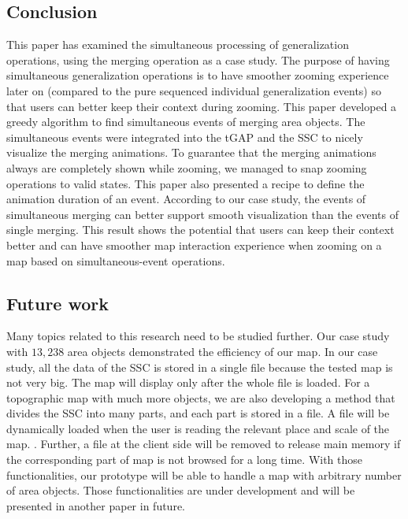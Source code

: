\documentclass[twocolumn]{svjour3}          %
\begin{document}
\subsection{Conclusion}
This paper has examined the simultaneous processing 
of generalization operations,
using the merging operation as a case study. 
The purpose of having simultaneous generalization operations 
is to have smoother zooming experience later on 
(compared to the pure sequenced individual generalization events)
so that users can better keep their context during zooming.
This paper developed a greedy algorithm to find simultaneous events of 
merging area objects.
The simultaneous events were integrated into 
the tGAP and the SSC to nicely visualize the merging animations.
To guarantee that the merging animations always are completely shown while zooming, 
we managed to snap zooming operations to valid states.
This paper also presented a recipe 
to define the animation duration of an event.
According to our case study,
the events of simultaneous merging 
can better support smooth visualization than the events of single merging.
This result shows the potential that
users can keep their context better 
and can have smoother map interaction experience
when zooming on a map based on simultaneous-event operations.



\subsection{Future work}

Many topics related to this research need to be studied further.
Our case study with $13{,}238$ area objects 
demonstrated the efficiency of our map.
In our case study, all the data of the SSC is stored in a single file
because the tested map is not very big.
The map will display only after the whole file is loaded.
For a topographic map with much more objects,
we are also developing a method that divides the SSC into many parts, 
and each part is stored in a file.
A file will be dynamically loaded 
when the user is reading the relevant place and scale of the map.
.
Further, a file at the client side will be removed to release main memory
if the corresponding part of map is not browsed for a long time. 
With those functionalities, our prototype will be able to handle 
a map with arbitrary number of area objects.
Those functionalities are under development 
and will be presented in another paper in future.
\end{document}
